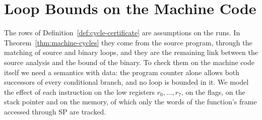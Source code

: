 \documentclass[oneside,english]{amsart}
\numberwithin{equation}{section}
\theoremstyle{plain}
\theoremstyle{definition}
\theoremstyle{plain}
\theoremstyle{plain}
\theoremstyle{remark}
\begin{document}
\section{Loop Bounds on the Machine Code}
\label{sec:loops}

The rows of Definition~\ref{def:cycle-certificate} are assumptions on the runs. In Theorem~\ref{thm:machine-cycles} they come from the source program, through the matching of source and binary loops, and they are the remaining link between the source analysis and the bound of the binary. To check them on the machine code itself we need a semantics with data: the program counter alone allows both successors of every conditional branch, and no loop is bounded in it. We model the effect of each instruction on the low registers $r_0, \dots, r_7$, on the flags, on the stack pointer and on the memory, of which only the words of the function's frame accessed through SP are tracked.
\end{document}
